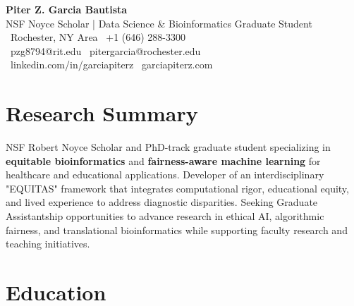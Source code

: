 \documentclass[10pt]{article}
\begin{document}

\begin{center}
    {\Huge \textbf{Piter Z. Garcia Bautista}} \\
    \vspace{5pt}
    {\Large NSF Noyce Scholar | Data Science \& Bioinformatics Graduate Student} \\
    \vspace{5pt}
    \faMapMarker* \, Rochester, NY Area \quad
    \faPhone \, +1 (646) 288-3300 \\
    \faEnvelope \, pzg8794@rit.edu \quad
    \faEnvelope \, pitergarcia@rochester.edu \\
    \faLinkedin \, linkedin.com/in/garciapiterz \quad
    \faGlobe \, garciapiterz.com
\end{center}


\section{Research Summary}
\vspace{-5pt}
NSF Robert Noyce Scholar and PhD-track graduate student specializing in \textbf{equitable bioinformatics} and \textbf{fairness-aware machine learning} for healthcare and educational applications. Developer of an interdisciplinary "EQUITAS" framework that integrates computational rigor, educational equity, and lived experience to address diagnostic disparities. Seeking Graduate Assistantship opportunities to advance research in ethical AI, algorithmic fairness, and translational bioinformatics while supporting faculty research and teaching initiatives.


\section{Education}
\end{document}
